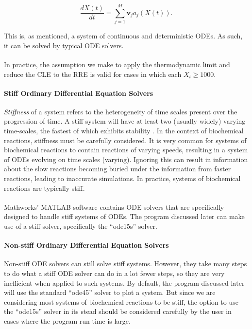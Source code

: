 \documentclass[ugrad,lot,lof,openright,11pt,oneside,onehalfspace]{RUthesis}
\begin{document}
				\begin{equation}\label{rre}
				\frac{dX(t)}{dt} = \sum\limits_{j=1}^{M} \mathbf{v}_j a_j(X(t)).
				\end{equation}

				\noindent
				This is, as mentioned, a system of continuous and deterministic ODEs. As such, it can be solved by typical ODE solvers.\\
				\\
				In practice, the assumption we make to apply the thermodynamic limit and reduce the CLE to the RRE is valid for cases in which each $X_i \geq 1000$.

				\paragraph{Stiff Ordinary Differential Equation Solvers}
				\textit{Stiffness} of a system refers to the heterogeneity of time scales present over the progression of time. A stiff system will have at least two (usually widely) varying time-scales, the fastest of which exhibits stability \cite{stiffness}. In the context of biochemical reactions, stiffness must be carefully considered. It is very common for systems of biochemical reactions to contain reactions of varying speeds, resulting in a system of ODEs evolving on time scales (varying). Ignoring this can result in information about the slow reactions becoming buried under the information from faster reactions, leading to inaccurate simulations. In practice, systems of biochemical reactions are typically stiff.\\
				\\
				Mathworks' MATLAB software contains ODE solvers that are specifically designed to handle stiff systems of ODEs. The program discussed later can make use of a stiff solver, specifically the ``ode15s'' solver.

				\paragraph{Non-stiff Ordinary Differential Equation Solvers}
				Non-stiff ODE solvers can still solve stiff systems. However, they take many steps to do what a stiff ODE solver can do in a lot fewer steps, so they are very inefficient when applied to such systems. By default, the program discussed later will use the standard ``ode45'' solver to plot a system. But since we are considering most systems of biochemical reactions to be stiff, the option to use the ``ode15s'' solver in its stead should be considered carefully by the user in cases where the program run time is large.
\end{document}
